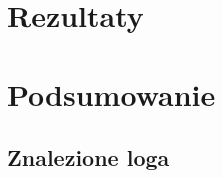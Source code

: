 \documentclass{article}
\begin{document}
\section{Rezultaty}
\label{sec:rezultaty}


\section{Podsumowanie}
\label{sec:podsumowanie}





\newpage
\begin{appendices}
\section{Znalezione loga}
\label{sec:zdjecia}

\end{appendices}
\end{document}
